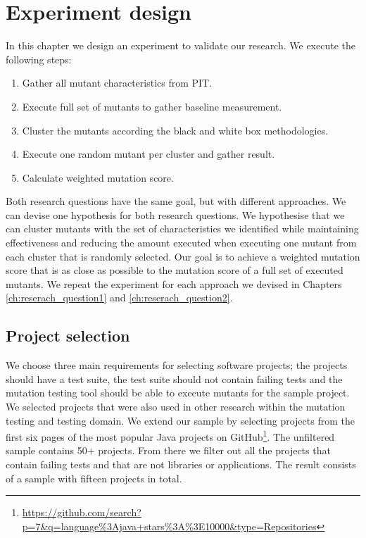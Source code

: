 \documentclass[../main]{subfiles}
\begin{document}
\chapter{Experiment design}
In this chapter we design an experiment to validate our research.
We execute the following steps:
\begin{enumerate}
    \item Gather all mutant characteristics from PIT.
    \item Execute full set of mutants to gather baseline measurement.
    \item Cluster the mutants according the black and white box methodologies.
    \item Execute one random mutant per cluster and gather result.
    \item Calculate weighted mutation score.
\end{enumerate}
Both research questions have the same goal, but with different approaches.
We can devise one hypothesis for both research questions.
We hypothesise that we can cluster mutants with the set of characteristics we identified
while maintaining effectiveness and reducing the amount executed when executing one mutant from each cluster that is randomly selected.
Our goal is to achieve a weighted mutation score that is as close as possible to the mutation score of a full set of executed mutants.
We repeat the experiment for each approach we devised in Chapters \ref{ch:reserach_question1} and \ref{ch:reserach_question2}.

\section{Project selection}
\label{ch:project_selection}
We choose three main requirements for selecting software projects; the projects should have a test suite, the test suite should not contain failing tests and the mutation testing tool should be able to execute mutants for the sample project.
We selected projects that were also used in other research within the mutation testing and testing domain\cite{Pizzoleto2019,Yu2019PossibilityScope,Wei2021SpectralTesting, Zhang2019PredictiveTesting, Chen2018SpeedingStudy, Laurent2017AssessingPIT}.
\newline
We extend our sample by selecting projects from the first six pages of the most popular Java projects on GitHub\footnote{\url{https://github.com/search?p=7&q=language\%3Ajava+stars\%3A\%3E10000&type=Repositories}}.
The unfiltered sample contains 50+ projects.
From there we filter out all the projects that contain failing tests and that are not libraries or applications.
The result consists of a sample with fifteen projects in total.
\end{document}
